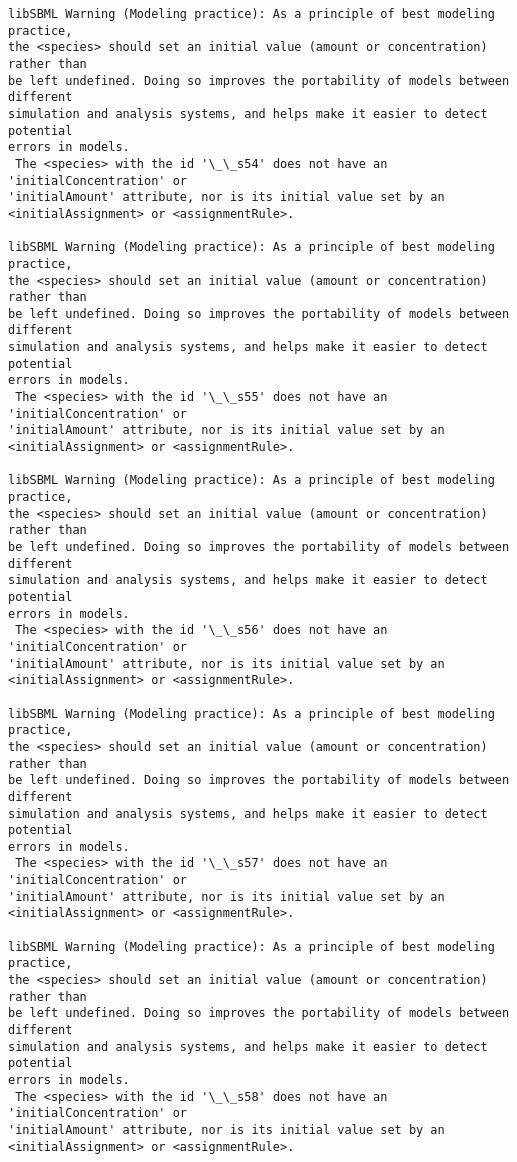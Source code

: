 \documentclass[11pt]{article}
\begin{document}
\begin{Verbatim}[commandchars=\\\{\}]
libSBML Warning (Modeling practice): As a principle of best modeling practice,
the <species> should set an initial value (amount or concentration) rather than
be left undefined. Doing so improves the portability of models between different
simulation and analysis systems, and helps make it easier to detect potential
errors in models.
 The <species> with the id '\_\_s54' does not have an 'initialConcentration' or
'initialAmount' attribute, nor is its initial value set by an
<initialAssignment> or <assignmentRule>.

libSBML Warning (Modeling practice): As a principle of best modeling practice,
the <species> should set an initial value (amount or concentration) rather than
be left undefined. Doing so improves the portability of models between different
simulation and analysis systems, and helps make it easier to detect potential
errors in models.
 The <species> with the id '\_\_s55' does not have an 'initialConcentration' or
'initialAmount' attribute, nor is its initial value set by an
<initialAssignment> or <assignmentRule>.

libSBML Warning (Modeling practice): As a principle of best modeling practice,
the <species> should set an initial value (amount or concentration) rather than
be left undefined. Doing so improves the portability of models between different
simulation and analysis systems, and helps make it easier to detect potential
errors in models.
 The <species> with the id '\_\_s56' does not have an 'initialConcentration' or
'initialAmount' attribute, nor is its initial value set by an
<initialAssignment> or <assignmentRule>.

libSBML Warning (Modeling practice): As a principle of best modeling practice,
the <species> should set an initial value (amount or concentration) rather than
be left undefined. Doing so improves the portability of models between different
simulation and analysis systems, and helps make it easier to detect potential
errors in models.
 The <species> with the id '\_\_s57' does not have an 'initialConcentration' or
'initialAmount' attribute, nor is its initial value set by an
<initialAssignment> or <assignmentRule>.

libSBML Warning (Modeling practice): As a principle of best modeling practice,
the <species> should set an initial value (amount or concentration) rather than
be left undefined. Doing so improves the portability of models between different
simulation and analysis systems, and helps make it easier to detect potential
errors in models.
 The <species> with the id '\_\_s58' does not have an 'initialConcentration' or
'initialAmount' attribute, nor is its initial value set by an
<initialAssignment> or <assignmentRule>.


\end{Verbatim}
\end{document}
